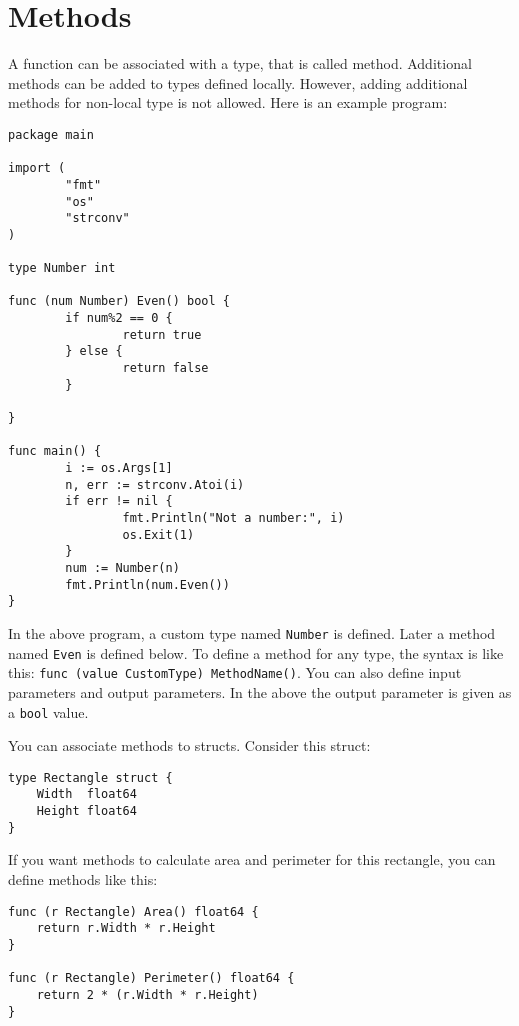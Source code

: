 \section{Methods}
\label{sec:methods}

A function can be associated with a type, that is called method.
Additional methods can be added to types defined locally.  However,
adding additional methods for non-local type is not allowed.  Here is
an example program:

\begin{lstlisting}[numbers=none]
package main

import (
        "fmt"
        "os"
        "strconv"
)

type Number int

func (num Number) Even() bool {
        if num%2 == 0 {
                return true
        } else {
                return false
        }

}

func main() {
        i := os.Args[1]
        n, err := strconv.Atoi(i)
        if err != nil {
                fmt.Println("Not a number:", i)
                os.Exit(1)
        }
        num := Number(n)
        fmt.Println(num.Even())
}
\end{lstlisting}

In the above program, a custom type named \texttt{Number} is
defined. Later a method named \texttt{Even} is defined below.  To
define a method for any type, the syntax is like this: \texttt{func
  (value CustomType) MethodName()}.  You can also define input
parameters and output parameters.  In the above the output parameter
is given as a \texttt{bool} value.

You can associate methods to structs. Consider this
struct:

\begin{lstlisting}[numbers=none]
type Rectangle struct {
    Width  float64
    Height float64
}
\end{lstlisting}

If you want methods to calculate area and perimeter for this rectangle,
you can define methods like this:

\begin{lstlisting}[numbers=none]
func (r Rectangle) Area() float64 {
    return r.Width * r.Height
}

func (r Rectangle) Perimeter() float64 {
    return 2 * (r.Width * r.Height)
}
\end{lstlisting}

